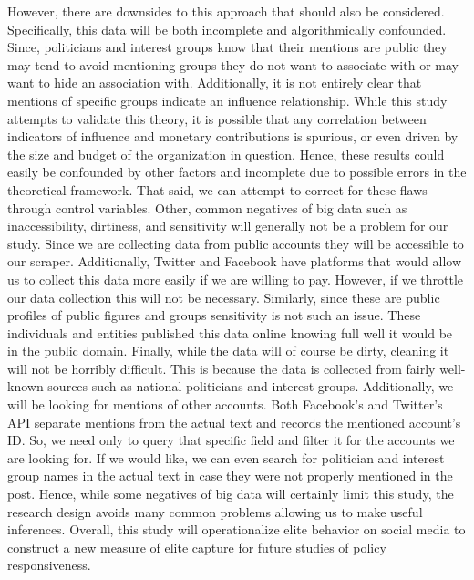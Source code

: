 \documentclass[dvips,12pt]{article}
\begin{document}
 However, there are downsides to this approach that should also be considered. Specifically, this data will be both incomplete and algorithmically confounded. Since, politicians and interest groups know that their mentions are public they may tend to avoid mentioning groups they do not want to associate with or may want to hide an association with. Additionally, it is not entirely clear that mentions of specific groups indicate an influence relationship. While this study attempts to validate this theory, it is possible that any correlation between indicators of influence and monetary contributions is spurious, or even driven by the size and budget of the organization in question. Hence, these results could easily be confounded by other factors and incomplete due to possible errors in the theoretical framework. That said, we can attempt to correct for these flaws through control variables. Other, common negatives of big data such as inaccessibility, dirtiness, and sensitivity will generally not be a problem for our study. Since we are collecting data from public accounts they will be accessible to our scraper. Additionally, Twitter and Facebook have platforms that would allow us to collect this data more easily if we are willing to pay. However, if we throttle our data collection this will not be necessary. Similarly, since these are public profiles of public figures and groups sensitivity is not such an issue. These individuals and entities published this data online knowing full well it would be in the public domain. Finally, while the data will of course be dirty, cleaning it will not be horribly difficult. This is because the data is collected from fairly well-known sources such as national politicians and interest groups. Additionally, we will be looking for mentions of other accounts. Both Facebook's and Twitter's API separate mentions from the actual text and records the mentioned account’s ID.  So, we need only to query that specific field and filter it for the accounts we are looking for. If we would like, we can even search for politician and interest group names in the actual text in case they were not properly mentioned in the post. Hence, while some negatives of big data will certainly limit this study, the research design avoids many common problems allowing us to make useful inferences. Overall, this study will operationalize elite behavior on social media to construct a new measure of elite capture for future studies of policy responsiveness.  

\newpage






\end{document}
